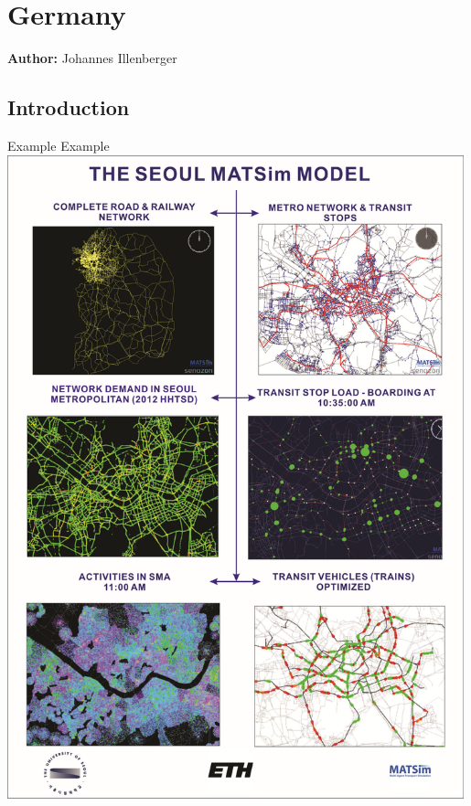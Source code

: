 \chapter{Germany}
\label{ch:germany}
\hfill \textbf{Author:} Johannes Illenberger


\section{Introduction}

\createfigure%
{Example}%
{Example}%
{\label{fig:example0}}%
{\includegraphics[width=0.99\textwidth, angle=0]{scenarios/figures/seoul}}%
{}


